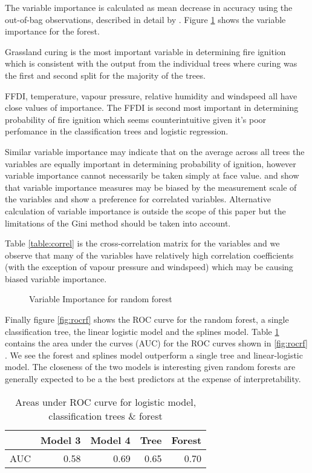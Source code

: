 \documentclass[11pt,a4paper]{article}
\begin{document}
The variable importance is calculated as mean decrease in accuracy using the out-of-bag observations, described in detail by \cite{archer08}. Figure \ref{fig:vimp} shows the variable importance for the forest. 

Grassland curing is the most important variable in determining fire ignition which is consistent with the output from the individual trees where curing was the first and second split for the majority of the trees. 

FFDI, temperature, vapour pressure, relative humidity and windspeed all have close values of importance. The FFDI is second most important in determining probability of fire ignition which seems counterintuitive given it's poor perfomance in the classification trees and logistic regression. 

Similar variable importance may indicate that on the average across all trees the variables are equally important in determining probability of ignition, however variable importance cannot necessarily be taken simply at face value. \cite{strob07}  and \cite{strob08} show that variable importance measures may be biased by the measurement scale of the variables and show a preference for correlated variables. Alternative calculation of variable importance is outside the scope of this paper but the limitations of the Gini method should be taken into account. 

Table \ref{table:correl} is the cross-correlation matrix for the variables and we observe that many of the variables have relatively high correlation coefficients (with the exception of vapour pressure and windspeed) which may be causing biased variable importance. 


\begin{figure}[h]
	\centering 
	\caption{Variable Importance for random forest} 
	\label{fig:vimp} 
\end{figure}

Finally figure \ref{fig:rocrf} shows the ROC curve for the random forest, a single classification tree, the linear logistic model and the splines model. Table \ref{table:AUC} contains the area under the curves (AUC) for the ROC curves shown in \ref{fig:rocrf} . We see the forest and splines model outperform a single tree and linear-logistic model. The closeness of the two models is interesting given random forests are generally expected to be a the best predictors at the expense of interpretability. 

\begin{table}[h]
	\centering
	\begin{tabular}{r|rrrr}
		\hline
		& Model 3 & Model 4 & Tree & Forest \\ 
		\hline
		AUC & 0.58 & 0.69 & 0.65 & 0.70 \\ 
		\hline
	\end{tabular}
	\caption{Areas under ROC curve for logistic model, classification trees \& forest}
	\label{table:AUC}
\end{table}
\end{document}
